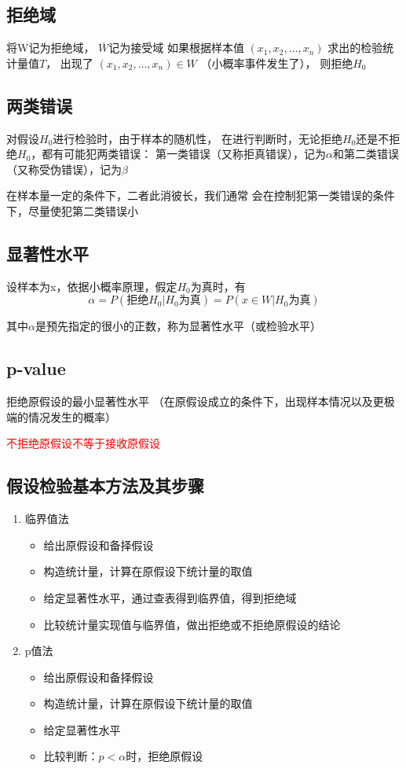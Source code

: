 \documentclass[UTF8]{ctexart}
\numberwithin{equation}{section}
\begin{document}
\subsection{拒绝域}
将W记为拒绝域， $\overline{W}$记为接受域
如果根据样本值 $(x_1, x_2, \dots , x_n)$ 求出的检验统计量值$T$，
出现了 $(x_1, x_2, \dots , x_n) \in W$ （小概率事件发生了），
则拒绝$H_0$

\subsection{两类错误}
对假设$H_0$进行检验时，由于样本的随机性，
在进行判断时，无论拒绝$H_0$还是不拒绝$H_0$，都有可能犯两类错误：
第一类错误（又称拒真错误），记为$\alpha$和第二类错误（又称受伪错误），记为$\beta$

在样本量一定的条件下，二者此消彼长，我们通常
会在控制犯第一类错误的条件下，尽量使犯第二类错误小

\subsection{显著性水平}
设样本为x，依据小概率原理，假定$H_0$为真时，有
\begin{equation}
    \alpha = P(\mbox{拒绝}H_0 | H_0 \mbox{为真}) = P(x \in W | H_0 \mbox{为真})
    \nonumber
\end{equation}

其中$\alpha$是预先指定的很小的正数，称为显著性水平（或检验水平）


\subsection{p-value}
拒绝原假设的最小显著性水平
（在原假设成立的条件下，出现样本情况以及更极端的情况发生的概率）

\textcolor{red}{不拒绝原假设不等于接收原假设}

\subsection{假设检验基本方法及其步骤}
\begin{enumerate}
    \item 临界值法
    \begin{itemize}
        \item 给出原假设和备择假设
        \item 构造统计量，计算在原假设下统计量的取值
        \item 给定显著性水平，通过查表得到临界值，得到拒绝域
        \item 比较统计量实现值与临界值，做出拒绝或不拒绝原假设的结论
    \end{itemize}
    
    \item p值法
    \begin{itemize}
        \item 给出原假设和备择假设
        \item 构造统计量，计算在原假设下统计量的取值
        \item 给定显著性水平
        \item 比较判断：$p<\alpha$时，拒绝原假设
    \end{itemize}
\end{enumerate}
\end{document}
